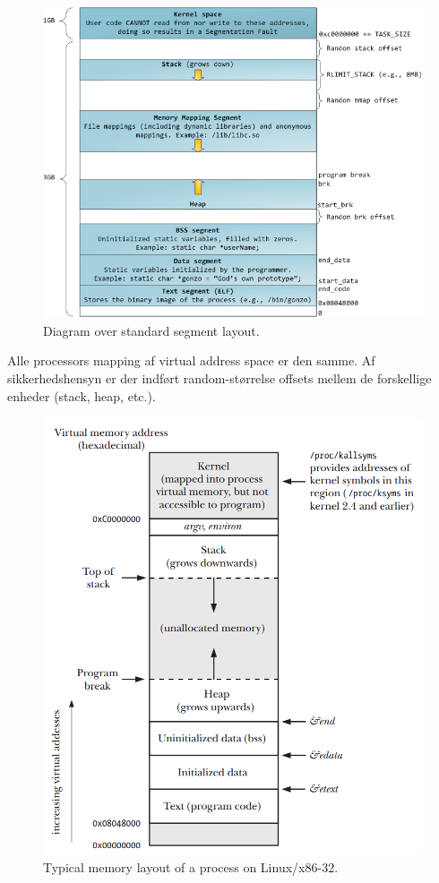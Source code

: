 \begin{figure}[H]
	\centering
	\includegraphics[width=\linewidth]{figs/memorydiagram}
	\caption{Diagram over standard segment layout.}
	\label{fig:memorydiagram}
\end{figure}

Alle processors mapping af virtual address space er den samme. Af sikkerhedshensyn er der indført random-størrelse offsets  mellem de forskellige enheder (stack, heap, etc.).\\

\begin{figure}
	\centering
	\includegraphics[width=0.7\linewidth]{figs/virtualaddressspace}
	\caption{Typical memory layout of a process on Linux/x86-32.}
	\label{fig:virtualaddressspace}
\end{figure}


